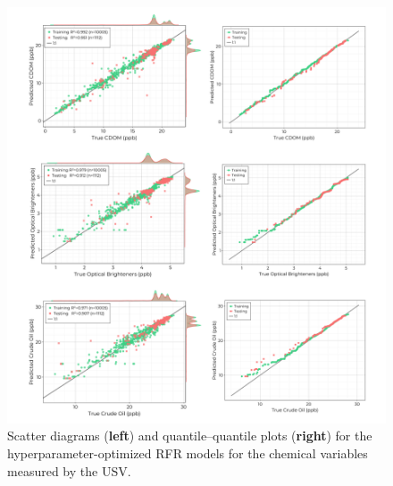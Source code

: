 \documentclass[remotesensing,article,accept,pdftex,moreauthors]{Definitions/mdpi}
\begin{document}
\begin{figure}[H]

\vspace{-0.21in}
\hspace{-6pt}\includegraphics[width=\columnwidth]{figures/results/fits/chemical-fitres.pdf}
\vspace{-0.11in}
\caption{Scatter diagrams (\textbf{left}) and quantile--quantile plots (\textbf{right}) for the hyperparameter-optimized RFR models for the chemical variables measured by the USV.\label{fig:chemicals-fit}}
\end{figure}  
\end{document}
